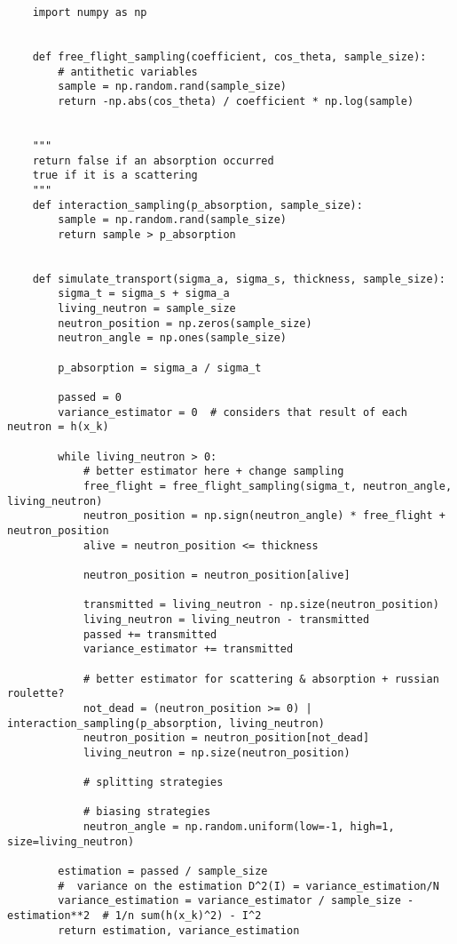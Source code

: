 \begin{lstlisting}
    import numpy as np


    def free_flight_sampling(coefficient, cos_theta, sample_size):
        # antithetic variables
        sample = np.random.rand(sample_size)
        return -np.abs(cos_theta) / coefficient * np.log(sample)
    
    
    """
    return false if an absorption occurred
    true if it is a scattering
    """
    def interaction_sampling(p_absorption, sample_size):
        sample = np.random.rand(sample_size)
        return sample > p_absorption
    
    
    def simulate_transport(sigma_a, sigma_s, thickness, sample_size):
        sigma_t = sigma_s + sigma_a
        living_neutron = sample_size
        neutron_position = np.zeros(sample_size)
        neutron_angle = np.ones(sample_size)
    
        p_absorption = sigma_a / sigma_t
    
        passed = 0
        variance_estimator = 0  # considers that result of each neutron = h(x_k)
    
        while living_neutron > 0:
            # better estimator here + change sampling
            free_flight = free_flight_sampling(sigma_t, neutron_angle, living_neutron)
            neutron_position = np.sign(neutron_angle) * free_flight + neutron_position
            alive = neutron_position <= thickness
    
            neutron_position = neutron_position[alive]
    
            transmitted = living_neutron - np.size(neutron_position)
            living_neutron = living_neutron - transmitted
            passed += transmitted
            variance_estimator += transmitted
    
            # better estimator for scattering & absorption + russian roulette?
            not_dead = (neutron_position >= 0) | interaction_sampling(p_absorption, living_neutron)
            neutron_position = neutron_position[not_dead]
            living_neutron = np.size(neutron_position)
    
            # splitting strategies
    
            # biasing strategies
            neutron_angle = np.random.uniform(low=-1, high=1, size=living_neutron)
    
        estimation = passed / sample_size
        #  variance on the estimation D^2(I) = variance_estimation/N
        variance_estimation = variance_estimator / sample_size - estimation**2  # 1/n sum(h(x_k)^2) - I^2
        return estimation, variance_estimation
\end{lstlisting}